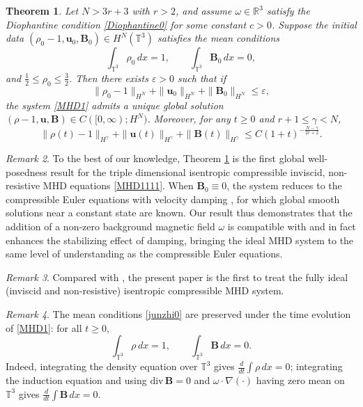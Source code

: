 \documentclass[12pt, reqno]{amsart}
\numberwithin{equation}{section}
\numberwithin{equation}{section}
\numberwithin{equation}{section}
\newtheorem{theorem}{Theorem}[section]
\numberwithin{equation}{section}
\theoremstyle{remark}
\newtheorem{remark}[theorem]{Remark}
\def\b{ \mathbf{B} }
\begin{document}
\begin{theorem}\label{dingli}
	Let $N>3r+3$ with $r>2$, and assume $\omega\in\mathbb{R}^3$ satisfy
	the Diophantine condition \eqref{Diophantine0} for some constant $c>0$.
	Suppose the initial data $(\rho_0-1, \mathbf{u}_0, \b_0)\in H^N(\mathbb{T}^3)$
	satisfies the mean conditions
	\begin{equation}\label{junzhi0}
		\int_{\mathbb{T}^3}\rho_0\,dx = 1, \qquad
		\int_{\mathbb{T}^3}\b_0\,dx = 0,
	\end{equation}
	and $\frac12\leq\rho_0\leq \frac32.$  Then there exists $\varepsilon>0$ such that if
	\begin{equation}\label{2026-6-27-3-1}
	\|\rho_0-1\|_{H^N} + \|\mathbf{u}_0\|_{H^N}
	+ \|\b_0\|_{H^N} \leq \varepsilon,
	\end{equation}
	the system \eqref{MHD1} admits a unique global solution
	$(\rho-1, \mathbf{u}, \b)\in C([0,\infty); H^N)$.
	Moreover, for any $t\geq 0$ and $r+1\leq\gamma< N$,
	\begin{equation}\label{decay}
		\|\rho(t)-1\|_{H^{\gamma}}
		+ \|\mathbf{u}(t)\|_{H^\gamma}
		+ \|\b(t)\|_{H^\gamma}
		\leq C(1+t)^{-\frac{N-\gamma}{2r+2}}.
	\end{equation}
\end{theorem}

\begin{remark}
	To the best of our knowledge, Theorem \ref{dingli} is the first
	global well-posedness result for the triple dimensional isentropic
	compressible inviscid, non-resistive MHD equations \eqref{MHD1111}.
	When $\b_0\equiv 0$, the system reduces to the compressible Euler
	equations with velocity damping \cite{STW,WY}, for which global smooth
	solutions near a constant state are known.  Our result thus demonstrates
	that the addition of a non-zero background magnetic field $\omega$ is
	compatible with and in fact enhances the stabilizing effect of damping,
	bringing the ideal MHD system to the same level of understanding as the
	compressible Euler equations.
\end{remark}

\begin{remark}
	Compared with \cite{Li-Qiao,Wang-Xin,Wu-Xu-Zhai}, the present paper is
	the first to treat the fully ideal (inviscid and non-resistive) isentropic
	compressible MHD system.
\end{remark}

\begin{remark}\label{remar3}
	The mean conditions \eqref{junzhi0} are preserved under the time
	evolution of \eqref{MHD1}: for all $t\geq 0$,
	\begin{equation}\label{junzhi1}
	\int_{\mathbb{T}^3}\rho\,dx = 1, \qquad
	\int_{\mathbb{T}^3}\b\,dx = 0.
	\end{equation}
	Indeed, integrating the density equation over $\mathbb{T}^3$ gives
	$\frac{d}{dt}\int\rho\,dx = 0$; integrating the induction equation
	and using $\mathrm{div}\,\b=0$ and $\omega\cdot\nabla(\cdot)$
	having zero mean on $\mathbb{T}^3$ gives $\frac{d}{dt}\int\b\,dx=0$.
\end{remark}
\end{document}
